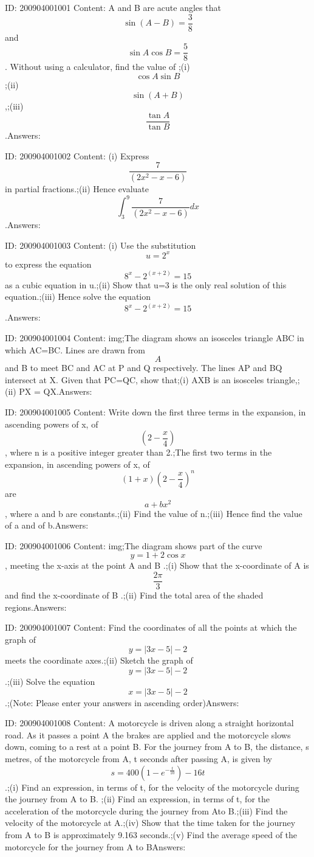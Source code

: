 \documentclass{article}
\begin{document}
ID: 200904001001
Content:
A and B are acute angles that $$\sin  (A-B) = \frac{3}{8}$$ and $$\sin A\cos B = \frac{5}{8}$$. Without using a calculator, find the value of ;(i) $$\cos A\sin B$$;(ii) $$\sin (A+B)$$,;(iii) $$\frac{\tan A}{\tan B}$$.Answers:

ID: 200904001002
Content:
(i) Express $$\frac{7}{(2x^2 -x-6)}$$ in partial fractions.;(ii) Hence evaluate $$\int_3^9 \frac{7}{(2x^2 -x-6)}dx$$.Answers:

ID: 200904001003
Content:
(i) Use the substitution $$u=2^x$$ to express the equation $$8^x -2^{(x+2)} = 15$$ as a cubic equation in u.;(ii) Show that u=3 is the only real solution of this equation.;(iii) Hence solve the equation $$8^x -2^{(x+2)} =15$$.Answers:

ID: 200904001004
Content:
img;The diagram shows an isosceles triangle ABC in which AC=BC. Lines are drawn from $$A$$ and B to meet BC and AC at P and Q respectively. The lines AP and BQ intersect at X. Given that PC=QC, show that;(i) AXB is an isosceles triangle,;(ii) PX = QX.Answers:

ID: 200904001005
Content:
Write down the first three terms in the expansion, in ascending powers of x, of $$(2-\frac{x}{4})$$, where n is a positive integer greater than 2.;The first two terms in the expansion, in ascending powers of x, of $$(1+x)(2-\frac{x}{4})^n$$ are $$a+bx^2$$, where a and b are constants.;(ii) Find the value of n.;(iii) Hence find the value of a and of b.Answers:

ID: 200904001006
Content:
img;The diagram shows part of the curve $$y=1+2\cos x$$, meeting the  x-axis at the point A and B .;(i) Show that the x-coordinate of A is $$\frac{2\pi }{3} $$ and find the x-coordinate of B .;(ii) Find the total area of the shaded regions.Answers:

ID: 200904001007
Content:
Find the coordinates of all the points at which the graph of $$y=|3x-5|-2$$ meets the coordinate axes.;(ii) Sketch the graph of $$y=|3x-5|-2$$.;(iii) Solve the equation $$x=|3x-5|-2$$.;(Note: Please enter your answers in ascending order)Answers:

ID: 200904001008
Content:
A motorcycle is driven along a straight horizontal road. As it passes a point A the brakes are applied and the motorcycle slows down, coming to a rest at a point B. For the journey from A to B, the distance, s metres, of the motorcycle from A, t seconds after passing A, is given by $$s =400(1-e^{-\frac{t}{10}})-16t$$.;(i) Find an expression, in terms of t, for the velocity of the motorcycle during the journey from A to B. ;(ii) Find an expression, in terms of t, for the acceleration of the motorcycle during the journey from Ato B.;(iii) Find the velocity of the motorcycle at A.;(iv) Show that the time taken for the journey from A to B is approximately 9.163 seconds.;(v) Find the average speed of the motorcycle for the journey from A to BAnswers:
\end{document}
